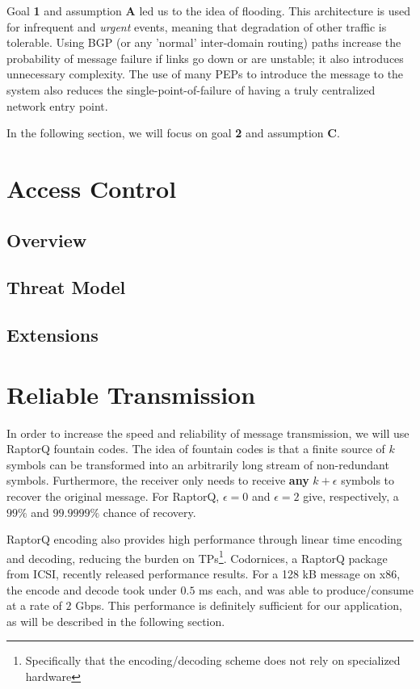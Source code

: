 Goal \textbf{1} and assumption \textbf{A} led us to the idea of flooding. This architecture is used for infrequent and \textit{urgent} events, meaning that degradation of other traffic is tolerable. Using BGP (or any 'normal' inter-domain routing) paths increase the probability of message failure if links go down or are unstable; it also introduces unnecessary complexity. The use of many PEPs to introduce the message to the system also reduces the single-point-of-failure of having a truly centralized network entry point.

In the following section, we will focus on goal \textbf{2} and assumption \textbf{C}. 
\section{Access Control}\label{acl}
\subsection{Overview}

\subsection{Threat Model}
\subsection{Extensions}
\section{Reliable Transmission}\label{reliable}
In order to increase the speed and reliability of message transmission, we will use RaptorQ fountain codes. The idea of fountain codes is that a finite source of $k$ symbols can be transformed into an arbitrarily long stream of non-redundant symbols. Furthermore, the receiver only needs to receive \textbf{any} $k + \epsilon$ symbols to recover the original message. For RaptorQ, $\epsilon = 0$ and $\epsilon = 2$ give, respectively, a $99\%$ and $99.9999\%$ chance of recovery.\cite{raptorq, raptorqpresent}

RaptorQ encoding also provides high performance through linear time encoding and decoding, reducing the burden on TPs\footnote{Specifically that the encoding/decoding scheme does not rely on specialized hardware}. Codornices, a RaptorQ package from ICSI, recently released performance results. For a 128 kB message on x86, the encode and decode took under $0.5$ ms each, and was able to produce/consume at a rate of $2$ Gbps\cite{raptorqperf}. This performance is definitely sufficient for our application, as will be described in the following section.
